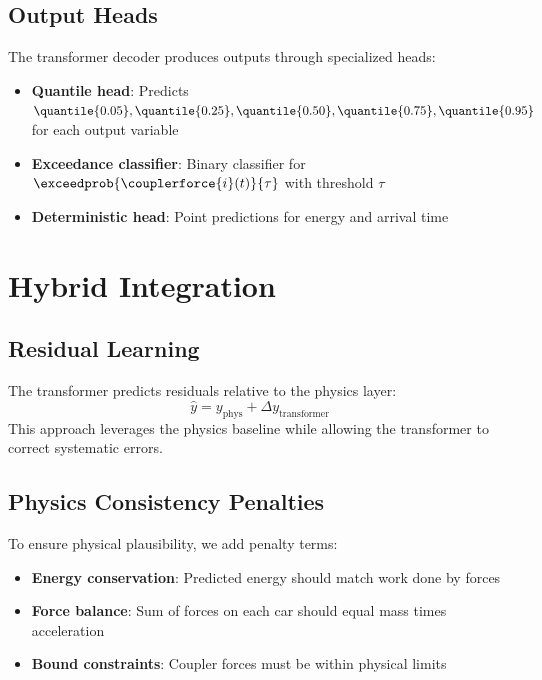 \subsection{Output Heads}

The transformer decoder produces outputs through specialized heads:
\begin{itemize}
    \item \textbf{Quantile head}: Predicts $\quantile{0.05}, \quantile{0.25}, \quantile{0.50}, \quantile{0.75}, \quantile{0.95}$ for each output variable
    \item \textbf{Exceedance classifier}: Binary classifier for $\exceedprob{\couplerforce{i}(t)}{\tau}$ with threshold $\tau$
    \item \textbf{Deterministic head}: Point predictions for energy and arrival time
\end{itemize}


\section{Hybrid Integration}

\subsection{Residual Learning}

The transformer predicts residuals relative to the physics layer:
\begin{equation}
    \hat{y} = y_{\text{phys}} + \Delta y_{\text{transformer}}
    \label{eq:residual_learning}
\end{equation}
This approach leverages the physics baseline while allowing the transformer to correct systematic errors.

\subsection{Physics Consistency Penalties}

To ensure physical plausibility, we add penalty terms:
\begin{itemize}
    \item \textbf{Energy conservation}: Predicted energy should match work done by forces
    \item \textbf{Force balance}: Sum of forces on each car should equal mass times acceleration
    \item \textbf{Bound constraints}: Coupler forces must be within physical limits
\end{itemize}

